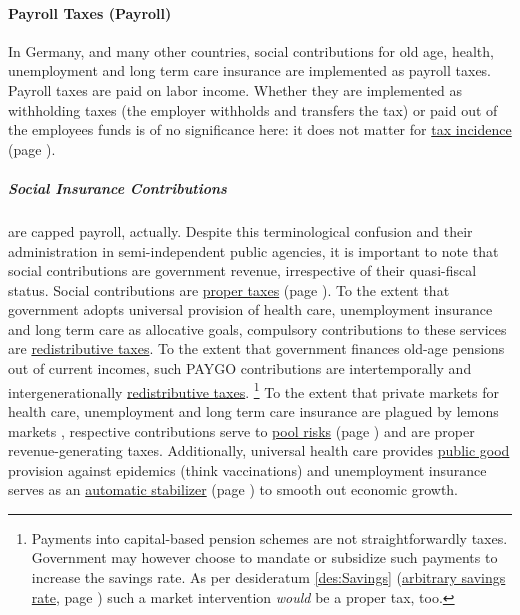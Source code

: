\paragraph{Payroll Taxes (Payroll)}
	\label{sec:Payroll}
In Germany, and many other countries, social contributions for old age, health, unemployment and long term care insurance are implemented as payroll taxes.
Payroll taxes are paid on labor income.
Whether they are implemented as withholding taxes (the employer withholds and transfers the tax) or paid out of the employees funds is of no significance here:
it does not matter for \hyperref[sec:TaxIncidence]{tax incidence} (page \pageref{sec:TaxIncidence}).

\subparagraph{Social Insurance Contributions}
	\label{sec:SIC}
are capped  \gls{payroll}, actually.
Despite this terminological confusion and their administration in semi-independent public agencies, it is important to note that social contributions are government revenue, irrespective of their quasi-fiscal status.
Social contributions are \hyperref[sec:PurposesOfTaxation]{proper taxes} (page \pageref{sec:PurposesOfTaxation}).
To the extent that government adopts universal provision of health care, unemployment insurance and long term care as allocative goals, compulsory contributions to these services are \hyperref[sec:Redistribution]{redistributive taxes}.
To the extent that government finances old-age pensions out of current incomes, such PAYGO contributions are intertemporally and intergenerationally \hyperref[sec:Redistribution]{redistributive taxes}.
\footnote{
	Payments into capital-based pension schemes are not straightforwardly taxes.
	Government may however choose to mandate or subsidize such payments to increase the savings rate.
	As per desideratum \ref{des:Savings} (\hyperref[des:Savings]{arbitrary savings rate}, page \pageref{des:Savings}) such a market intervention \emph{would} be a proper tax, too.
}
To the extent that private markets for health care, unemployment and long term care insurance are plagued by lemons markets \citep{Akerlof-1970-aa}, respective contributions serve to \hyperref[sec:RiskPooling]{pool risks} (page \pageref{sec:RiskPooling}) and are proper revenue-generating taxes.
Additionally, universal health care provides \hyperref[sec:PublicGood]{public good} provision against epidemics (think vaccinations) and unemployment insurance serves as an \hyperref[des:AutomaticStabilizer]{automatic stabilizer} (page \pageref{des:AutomaticStabilizer}) to smooth out economic growth.

